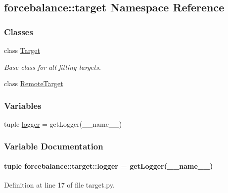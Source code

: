 \hypertarget{namespaceforcebalance_1_1target}{\subsection{forcebalance\-:\-:target \-Namespace \-Reference}
\label{namespaceforcebalance_1_1target}
}
\subsubsection*{\-Classes}
\begin{DoxyCompactItemize}
\item 
class \hyperlink{classforcebalance_1_1target_1_1Target}{\-Target}
\begin{DoxyCompactList}\small\item\em \-Base class for all fitting targets. \end{DoxyCompactList}\item 
class \hyperlink{classforcebalance_1_1target_1_1RemoteTarget}{\-Remote\-Target}
\end{DoxyCompactItemize}
\subsubsection*{\-Variables}
\begin{DoxyCompactItemize}
\item 
tuple \hyperlink{namespaceforcebalance_1_1target_a6b5ddff6e409717872f8dbdb243183eb}{logger} = get\-Logger(\-\_\-\-\_\-name\-\_\-\-\_\-)
\end{DoxyCompactItemize}


\subsubsection{\-Variable \-Documentation}
\hypertarget{namespaceforcebalance_1_1target_a6b5ddff6e409717872f8dbdb243183eb}{
\paragraph[{logger}]{\setlength{\rightskip}{0pt plus 5cm}tuple {\bf forcebalance\-::target\-::logger} = get\-Logger(\-\_\-\-\_\-name\-\_\-\-\_\-)}}\label{namespaceforcebalance_1_1target_a6b5ddff6e409717872f8dbdb243183eb}


\-Definition at line 17 of file target.\-py.

